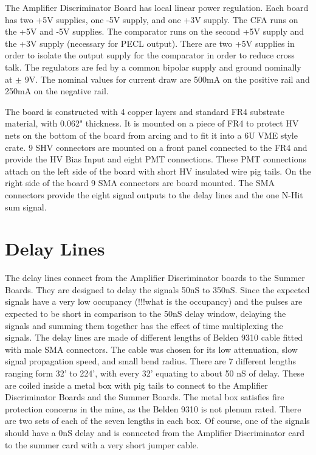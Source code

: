 \documentclass[preprint,12pt]{elsarticle}
\begin{document}
The Amplifier Discriminator Board has local linear power regulation.  Each board has two +5V supplies, one -5V supply, and one +3V supply.  The CFA runs on the +5V and -5V supplies.  The comparator runs on the second +5V supply and the +3V supply (necessary for PECL output).  There are two +5V supplies in order to isolate the output supply for the comparator in order to reduce cross talk.  The regulators are fed by a common bipolar supply and ground nominally at $\pm$ 9V.  The nominal values for current draw are 500mA on the positive rail and 250mA on the negative rail.

The board is constructed with 4 copper layers and standard FR4 substrate material, with 0.062" thickness.  It is mounted on a piece of FR4 to protect HV nets on the bottom of the board from arcing and to fit it into a 6U VME style crate.  9 SHV connectors are mounted on a front panel connected to the FR4 and provide the HV Bias Input and eight PMT connections.  These PMT connections attach on the left side of the board with short HV insulated wire pig tails.  On the right side of the board 9 SMA connectors are board mounted.  The SMA connectors provide the eight signal outputs to the delay lines and the one N-Hit sum signal.

\section{Delay Lines}
\label{Delay}
The delay lines connect from the Amplifier Discriminator boards to the Summer Boards.  They are designed to delay the signals 50nS to 350nS.  Since the expected signals have a very low occupancy (!!!what is the occupancy) and the pulses are expected to be short in comparison to the 50nS delay window, delaying the signals and summing them together has the effect of time multiplexing the signals.  The delay lines are made of different lengths of Belden 9310 cable fitted with male SMA connectors.  The cable was chosen for its low attenuation, slow signal propagation speed, and small bend radius.  There are 7 different lengths ranging form 32' to 224', with every 32' equating to about 50 nS of delay.  These are coiled inside a metal box with pig tails to connect to the Amplifier Discriminator Boards and the Summer Boards.  The metal box satisfies fire protection concerns in the mine, as the Belden 9310 is not plenum rated.  There are two sets of each of the seven lengths in each box.  Of course, one of the signals should have a 0nS delay and is connected from the Amplifier Discriminator card to the summer card with a very short jumper cable.
\end{document}
